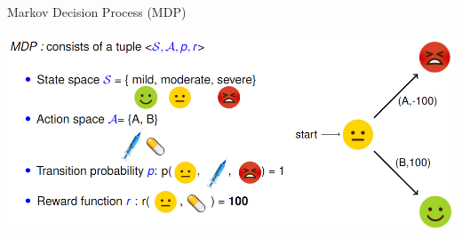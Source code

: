 \begin{block}{Markov Decision Process (MDP)}
\vspace{0.15cm}
    \begin{center}
    \includegraphics[width=0.95\linewidth]{fig/mdp.png}    
  \end{center}
  \vspace{0.15cm}
\end{block}

